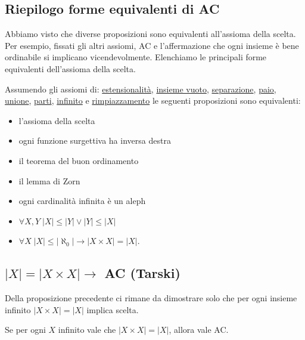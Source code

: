 \subsection{\texorpdfstring{\;Riepilogo forme equivalenti di AC}{Riepilogo forme equivalenti di AC}}
Abbiamo visto che diverse proposizioni sono equivalenti all'assioma della scelta. Per esempio, fissati gli altri assiomi, AC e 
l'affermazione che ogni insieme \`e bene ordinabile si implicano vicendevolmente. Elenchiamo le principali forme equivalenti dell'assioma della scelta.

\begin{proposition}
	Assumendo gli assiomi di: \hyperref[ax2]{estensionalit\`a}, \hyperref[ax1]{insieme vuoto}, \hyperref[ax3]{separazione}, \hyperref[ax4]{paio}, \hyperref[ax5]{unione},
	\hyperref[ax6]{parti}, \hyperref[ax7]{infinito} e \hyperref[ax8]{rimpiazzamento} le seguenti proposizioni sono equivalenti:
	\begin{itemize}
		\item l'assioma della scelta
		\item ogni funzione surgettiva ha inversa destra
		\item il teorema del buon ordinamento
		\item il lemma di Zorn
		\item ogni cardinalit\`a infinita \`e un aleph
		\item $\forall X,Y \; |X| \leq |Y| \lor |Y| \leq |X|$
		\item $\forall X \; |X| \leq |\aleph_0| \rightarrow |X \times X| = |X|$.
	\end{itemize}
\end{proposition}

\subsection{\texorpdfstring{\;$|X| = |X \times X| \rightarrow$ AC (Tarski)}{Teorema di Tarski sulla scelta}}
Della proposizione precedente ci rimane da dimostrare solo che per ogni insieme infinito $|X \times X| = |X|$ implica scelta.

\begin{theorem}
	Se per ogni $X$ infinito vale che $|X \times X| = |X|$, allora vale AC.
\end{theorem}

